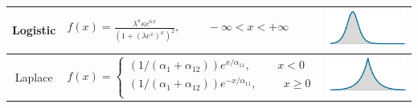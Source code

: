 \documentclass[12pt]{article}
\begin{document}
\begin{table}
\begin{center}
\begin{tabular} {|c | l | c|}
 \rule{0pt}{25pt} Logistic & $f(x)=\frac{\lambda^{\kappa}\kappa e^{\kappa x}}{(1+(\lambda e^{x})^{\kappa})^{2}}, \hspace{1cm} -\infty<x<+\infty$ &  \begin{minipage}{3cm}\includegraphics[width=1\textwidth]{images/Logistic_dist.png} \end{minipage}\\ \hline
  
  Laplace & $f(x)=
  \begin{cases}
  (1/(\alpha_{1}+\alpha_{12}))e^{x/\alpha_{11}}, \hspace{1cm} x<0\\
  (1/(\alpha_{1}+\alpha_{12}))e^{-x/\alpha_{11}}, \hspace{1cm} x \geq 0\\
  \end{cases}
  $& \begin{minipage}{3cm}\includegraphics[width=1\textwidth]{images/Laplace_dist.png} \end{minipage} \\ \hline
  

\end{tabular}
\end{center}
\end{table}
\end{document}
